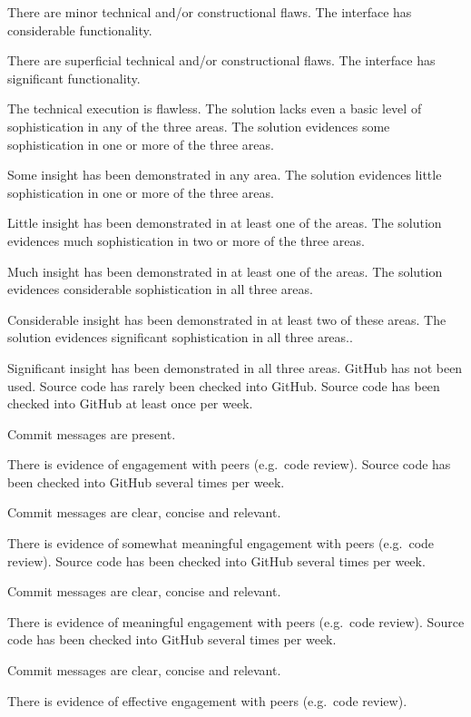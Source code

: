 \documentclass{../fal_assignment}
\begin{document}
\begin{markingrubric}
            \par There are minor technical and/or constructional flaws.
        \grade The interface has considerable functionality.
            \par There are superficial technical and/or constructional flaws.
        \grade The interface has significant functionality.
            \par The technical execution is flawless.
%
        \grade\fail The solution lacks even a basic level of sophistication in any of the three areas.
        \grade The solution evidences some sophistication in one or more of the three areas.
            \par Some insight has been demonstrated in any area.
        \grade The solution evidences little sophistication in one or more of the three areas.
            \par Little insight has been demonstrated in at least one of the areas.
        \grade The solution evidences much sophistication in two or more of the three areas.
            \par Much insight has been demonstrated in at least one of the areas.
        \grade The solution evidences considerable sophistication in all three areas.
            \par Considerable insight has been demonstrated in at least two of these areas.
        \grade The solution evidences significant sophistication in all three areas..
            \par Significant insight has been demonstrated in all three areas.
%            
        \grade\fail GitHub has not been used.
        \grade Source code has rarely been checked into GitHub.
        \grade Source code  has been checked into GitHub at least once per week.
            \par Commit messages are present.
            \par There is evidence of engagement with peers (e.g.\ code review).
        \grade Source code  has been checked into GitHub several times per week.
            \par Commit messages are clear, concise and relevant.
            \par There is evidence of somewhat meaningful engagement with peers (e.g.\ code review).
        \grade Source code has been checked into GitHub several times per week.
            \par Commit messages are clear, concise and relevant.
            \par There is evidence of meaningful engagement with peers (e.g.\ code review).
        \grade Source code has been checked into GitHub several times per week.
            \par Commit messages are clear, concise and relevant.
            \par There is evidence of effective engagement with peers (e.g.\ code review).
%
\end{markingrubric}
\end{document}
